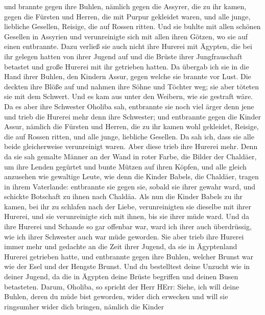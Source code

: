 und brannte gegen ihre Buhlen, nämlich gegen die Assyrer, die zu ihr
kamen,  gegen die Fürsten und Herren, die mit Purpur
gekleidet waren, und alle junge, liebliche Gesellen, Reisige, die auf
Rossen ritten.  Und sie buhlte mit allen schönen Gesellen in
Assyrien und verunreinigte sich mit allen ihren Götzen, wo sie auf einen
entbrannte.  Dazu verließ sie auch nicht ihre Hurerei mit
Ägypten, die bei ihr gelegen hatten von ihrer Jugend auf und die Brüste
ihrer Jungfrauschaft betastet und große Hurerei mit ihr getrieben
hatten.  Da übergab ich sie in die Hand ihrer Buhlen, den
Kindern Assur, gegen welche sie brannte vor Lust.  Die
deckten ihre Blöße auf und nahmen ihre Söhne und Töchter weg; sie aber
töteten sie mit dem Schwert. Und es kam aus unter den Weibern, wie sie
gestraft wäre.  Da es aber ihre Schwester Oholiba sah,
entbrannte sie noch viel ärger denn jene und trieb die Hurerei mehr denn
ihre Schwester;  und entbrannte gegen die Kinder Assur,
nämlich die Fürsten und Herren, die zu ihr kamen wohl gekleidet,
Reisige, die auf Rossen ritten, und alle junge, liebliche Gesellen.
 Da sah ich, dass sie alle beide gleicherweise verunreinigt
waren.  Aber diese trieb ihre Hurerei mehr. Denn da sie sah
gemalte Männer an der Wand in roter Farbe, die Bilder der Chaldäer,
 um ihre Lenden gegürtet und bunte Mützen auf ihren Köpfen,
und alle gleich anzusehen wie gewaltige Leute, wie denn die Kinder
Babels, die Chaldäer, tragen in ihrem Vaterlande: 
entbrannte sie gegen sie, sobald sie ihrer gewahr ward, und schickte
Botschaft zu ihnen nach Chaldäa.  Als nun die Kinder Babels
zu ihr kamen, bei ihr zu schlafen nach der Liebe, verunreinigten sie
dieselbe mit ihrer Hurerei, und sie verunreinigte sich mit ihnen, bis
sie ihrer müde ward.  Und da ihre Hurerei und Schande so
gar offenbar war, ward ich ihrer auch überdrüssig, wie ich ihrer
Schwester auch war müde geworden.  Sie aber trieb ihre
Hurerei immer mehr und gedachte an die Zeit ihrer Jugend, da sie in
Ägyptenland Hurerei getrieben hatte,  und entbrannte gegen
ihre Buhlen, welcher Brunst war wie der Esel und der Hengste Brunst.
 Und du bestelltest deine Unzucht wie in deiner Jugend, da
die in Ägypten deine Brüste begriffen und deinen Busen betasteten.
 Darum, Oholiba, so spricht der Herr HErr: Siehe, ich will
deine Buhlen, deren du müde bist geworden, wider dich erwecken und will
sie ringsumher wider dich bringen,  nämlich die Kinder
